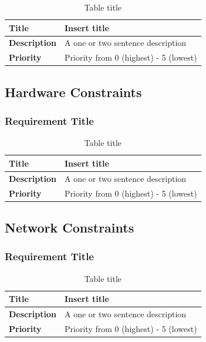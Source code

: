 \documentclass{article}
\begin{document}
\begin{table}[H]
\caption{Table title}
\begin{tabularx}{\textwidth}{|l|X|}
    \hline
    \textbf{Title} & Insert title \\ \hline
    \textbf{Description} &  A one or two sentence description \\ \hline 
    \textbf{Priority} &  Priority from 0 (highest) - 5 (lowest) \\ \hline       
\end{tabularx}
\end{table}

\subsection{Hardware Constraints}

\subsubsection{Requirement Title}

\begin{table}[H]
\caption{Table title}
\begin{tabularx}{\textwidth}{|l|X|}
    \hline
    \textbf{Title} & Insert title \\ \hline
    \textbf{Description} &  A one or two sentence description \\ \hline 
    \textbf{Priority} &  Priority from 0 (highest) - 5 (lowest) \\ \hline       
\end{tabularx}
\end{table}

\subsection{Network Constraints}

\subsubsection{Requirement Title}

\begin{table}[H]
\caption{Table title}
\begin{tabularx}{\textwidth}{|l|X|}
    \hline
    \textbf{Title} & Insert title \\ \hline
    \textbf{Description} &  A one or two sentence description \\ \hline 
    \textbf{Priority} &  Priority from 0 (highest) - 5 (lowest) \\ \hline       
\end{tabularx}
\end{table}
\end{document}

